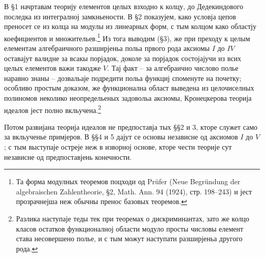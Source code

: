 ﻿\documentclass[11pt]{article}
\begin{document}
В §1 начртавам теорију елементов целых взходно к колцу, до Дедекиндового последка из интегралној замкньености. В §2 показујем, како условја цепов преносет се из колца на модулы из линеарных форм, с тым колцом како областју коефициентов и множительев.\footnote{Та форма модулных теоремов поцходи од Prüfer (Neue Begründung der algebraischen Zahlentheorie, §2, Math. Ann. 94 (1924), стр. 198--243) и јест прозрачнејша неж обычны пренос базовых теоремов.} Из тога выводим (§3), же при преходу к целым елементам алгебраичного разширјеньа польа првого рода аксиомы $I$ до $IV$ оставајут валидне за всакы порјадок, доколе за порјадок состојајучи из всих целых елементов важи такодже $V$. Тај факт -- за алгебраично числово полье наравно знаны -- дозвальаје подредити польа функциј споменуте на почетку; особливо простым доказом, же функционална област выведена из целочиселных полиномов неколико неопредельеных задовольа аксиомы, Кронецкерова теорија идеалов јест полно вкльучена.\footnote{Разлика наступаје теды тек при теоремах о дискриминантах, зато же колцо класов остатков функционалној области модуло просты числовы елемент става несовершено полье, и с тым можут наступати разширјеньа другого рода.}

Потом развијана теорија идеалов не предпоставја тых §§2 и 3, кторе служет само за вкльученье примјеров. В §§4 и 5 дајут се основы независне од аксиомов $I$ до $V$; с тым выступаје остреје неж в изворној основе, кторе чести теорије сут независне од предпоставјень конечности.
\end{document}
